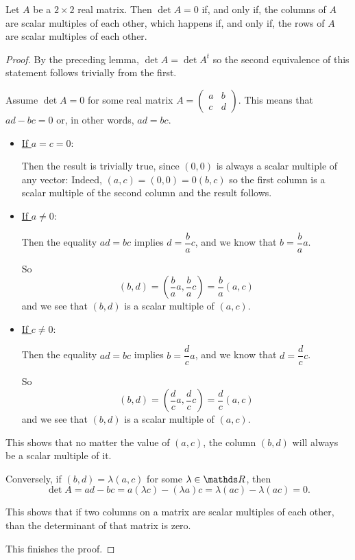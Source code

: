 \begin{prop}
	Let $A$ be a $2\times 2$ real matrix. Then $\det A=0$ if, and only if, the columns of $A$ are scalar multiples of each other, which happens if, and only if, the rows of $A$ are scalar multiples of each other.
\end{prop}
\begin{proof}
	By the preceding lemma, $\det A=\det A^t$ so the second equivalence of this statement follows trivially from the first.
	
	Assume $\det A=0$ for some real matrix $A=\begin{pmatrix}
	a&b\\c&d
	\end{pmatrix}$. This means that $ad-bc=0$ or, in other words, $ad=bc$.
	
	\begin{itemize}
		\item \underline{If $a=c=0$}:
		
		Then the result is trivially true, since $(0,0)$ is always a scalar multiple of any vector: Indeed, $(a,c)=(0,0)=0(b,c)$ so the first column is a scalar multiple of the second column and the result follows.
		
		\item \underline{If $a\neq 0$}:
		
		Then the equality $ad=bc$ implies $d=\dfrac{b}{a}c$, and we know that $b=\dfrac{b}{a}a$.
		
		So
		\[\left(b,d\right)=\left(\frac{b}{a}a,\frac{b}{a}c\right)=\frac{b}{a}\left(a,c\right)\]and we see that $(b,d)$ is a scalar multiple of $(a,c)$.
		
		\item \underline{If $c\neq 0$}:
		
		Then the equality $ad=bc$ implies $b=\dfrac{d}{c}a$, and we know that $d=\dfrac{d}{c}c$.
		
		So
		\[\left(b,d\right)=\left(\frac{d}{c}a,\frac{d}{c}c\right)=\frac{d}{c}(a,c)\]and we see that $(b,d)$ is a scalar multiple of $(a,c)$.
	\end{itemize}

This shows that no matter the value of $(a,c)$, the column $(b,d)$ will always be a scalar multiple of it.

\bigskip
Conversely, if $(b,d)=\lambda (a,c)$ for some $\lambda \in \R$, then
\[\det A=ad-bc=a(\lambda c)-(\lambda a)c=\lambda(ac)-\lambda(ac)=0.\]

This shows that if two columns on a matrix are scalar multiples of each other, than the determinant of that matrix is zero.

\bigskip
This finishes the proof.
\end{proof}


